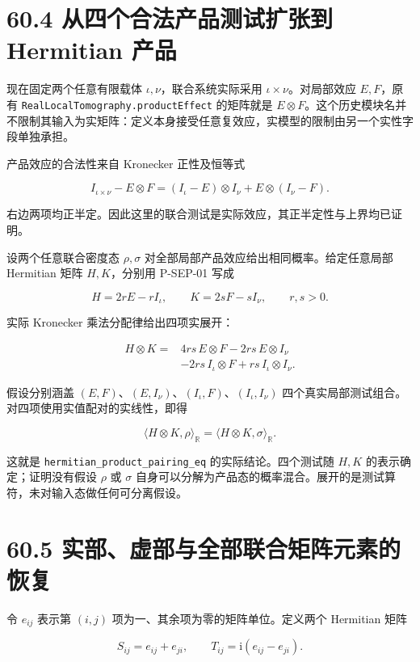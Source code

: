 \documentclass[
  11pt,
  oneside]{book}
\begin{document}
\section{60.4 从四个合法产品测试扩张到 Hermitian 产品}

现在固定两个任意有限载体 \(\iota,\nu\)，联合系统实际采用
\(\iota\times\nu\)。对局部效应 \(E,F\)，原有
\texttt{Real\allowbreak Local\allowbreak Tomography.\allowbreak product\allowbreak Effect} 的矩阵就是
\(E\otimes F\)。这个历史模块名并不限制其输入为实矩阵：定义本身接受任意复效应，实模型的限制由另一个实性字段单独承担。

产品效应的合法性来自 Kronecker 正性及恒等式

\[
I_{\iota\times\nu}-E\otimes F
=(I_\iota-E)\otimes I_\nu
+E\otimes(I_\nu-F).
\]

右边两项均正半定。因此这里的联合测试是实际效应，其正半定性与上界均已证明。

设两个任意联合密度态 \(\rho,\sigma\)
对全部局部产品效应给出相同概率。给定任意局部 Hermitian 矩阵
\(H,K\)，分别用 P-SEP-01 写成

\[
H=2rE-rI_\iota,\qquad K=2sF-sI_\nu,
\qquad r,s>0.
\]

实际 Kronecker 乘法分配律给出四项实展开：

\[
\begin{aligned}
H\otimes K={}&4rs\,E\otimes F
-2rs\,E\otimes I_\nu\\
&-2rs\,I_\iota\otimes F
+rs\,I_\iota\otimes I_\nu.
\end{aligned}
\]

假设分别涵盖
\((E,F)\)、\((E,I_\nu)\)、\((I_\iota,F)\)、\((I_\iota,I_\nu)\)
四个真实局部测试组合。对四项使用实值配对的实线性，即得

\[
\langle H\otimes K,\rho\rangle_{\mathbb R}
=\langle H\otimes K,\sigma\rangle_{\mathbb R}.
\]

这就是 \texttt{hermitian\_\allowbreak product\_\allowbreak pairing\_\allowbreak eq} 的实际结论。四个测试随
\(H,K\) 的表示确定；证明没有假设 \(\rho\) 或 \(\sigma\)
自身可以分解为产品态的概率混合。展开的是测试算符，未对输入态做任何可分离假设。

\section{60.5 实部、虚部与全部联合矩阵元素的恢复}

令 \(e_{ij}\) 表示第 \((i,j)\) 项为一、其余项为零的矩阵单位。定义两个
Hermitian 矩阵

\[
S_{ij}=e_{ij}+e_{ji},\qquad
T_{ij}=\mathrm i(e_{ij}-e_{ji}).
\]
\end{document}

